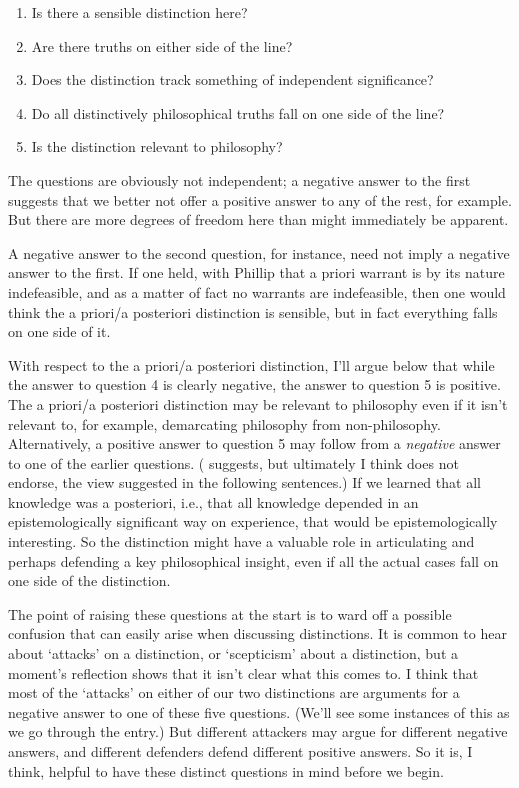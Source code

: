\begin{enumerate}
\item Is there a sensible distinction here?

\item Are there truths on either side of the line?

\item Does the distinction track something of independent significance?

\item Do all distinctively philosophical truths fall on one side of the line?

\item Is the distinction relevant to philosophy?

\end{enumerate}
The questions are obviously not independent; a negative answer to the first suggests that we better not offer a positive answer to any of the rest, for example. But there are more degrees of freedom here than might immediately be apparent. 

A negative answer to the second question, for instance, need not imply a negative answer to the first. If one held, with Phillip  \citet{Kitcher1980} that a priori warrant is by its nature indefeasible, and as a matter of fact no warrants are indefeasible, then one would think the a priori\slash a posteriori distinction is sensible, but in fact everything falls on one side of it. 

With respect to the a priori/a posteriori distinction, I'll argue below that while the answer to question 4 is clearly negative, the answer to question 5 is positive. The a priori\slash a posteriori distinction may be relevant to philosophy even if it isn't relevant to, for example, demarcating philosophy from non-philosophy. Alternatively, a positive answer to question 5 may follow from a \emph{negative} answer to one of the earlier questions. (\citet{Williamson2013} suggests, but ultimately I think does not endorse, the view suggested in the following sentences.) If we learned that all knowledge was a posteriori, i.e., that all knowledge depended in an epistemologically significant way on experience, that would be epistemologically interesting. So the distinction might have a valuable role in articulating and perhaps defending a key philosophical insight, even if all the actual cases fall on one side of the distinction.

The point of raising these questions at the start is to ward off a possible confusion that can easily arise when discussing distinctions. It is common to hear about `attacks' on a distinction, or `scepticism' about a distinction, but a moment's reflection shows that it isn't clear what this comes to. I think that most of the `attacks' on either of our two distinctions are arguments for a negative answer to one of these five questions. (We'll see some instances of this as we go through the entry.) But different attackers may argue for different negative answers, and different defenders defend different positive answers. So it is, I think, helpful to have these distinct questions in mind before we begin.

